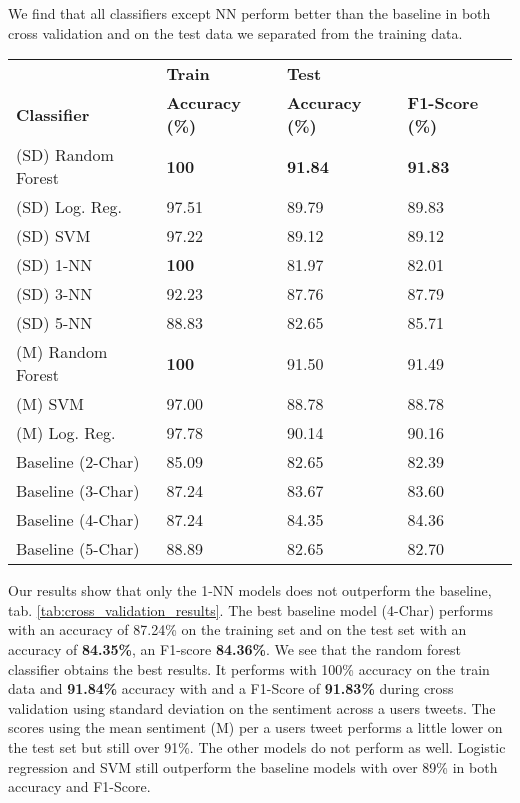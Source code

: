 We find that all classifiers except NN perform better than the baseline in both cross validation and on the test data we separated from the training data. \par

\begin{table*}[!h]
    \centering
    \begin{tabular}{ll|ll}
    \toprule
      & \textbf{Train} & \textbf{Test} &  \\
      \textbf{Classifier} & \textbf{Accuracy (\%)} & \textbf{Accuracy (\%)}  & \textbf{F1-Score (\%)}  \\
    \midrule
    (SD) Random Forest & \textbf{100} & \textbf{91.84} & \textbf{91.83} \\
    (SD) Log. Reg. & 97.51 & 89.79 & 89.83 \\
    (SD) SVM & 97.22 & 89.12 & 89.12 \\
    (SD) 1-NN & \textbf{100} & 81.97 & 82.01 \\
    (SD) 3-NN & 92.23 & 87.76 & 87.79\\
    (SD) 5-NN & 88.83 & 82.65 & 85.71\\
    (M) Random Forest & \textbf{100} & 91.50 & 91.49 \\
    (M) SVM & 97.00 & 88.78 & 88.78 \\
    (M) Log. Reg. & 97.78 & 90.14 & 90.16 \\
    
    \hline
    Baseline (2-Char) & 85.09 & 82.65 & 82.39 \\
    Baseline (3-Char) & 87.24 & 83.67 & 83.60 \\
    Baseline (4-Char) & 87.24 & 84.35 & 84.36 \\
    Baseline (5-Char) & 88.89 & 82.65 & 82.70 \\
    \bottomrule
    \end{tabular}
   \caption{Cross-Validation on 70\% of the train data, n splits = 7. In bold, the best performing metrics. (M) denotes that the mean sentiment was used to combine the Tweet Sentiment, while (SD) denotes standard deviation was used.}
    \label{tab:cross_validation_results}
\end{table*}


Our results show that only the 1-NN models does not outperform the baseline, tab. \ref{tab:cross_validation_results}. The best baseline model (4-Char) performs with an accuracy of 87.24\% on the training set and on the test set with an accuracy of \textbf{84.35\%}, an F1-score \textbf{84.36\%}. We see that the random forest classifier obtains the best results. It performs with 100\% accuracy on the train data and \textbf{91.84\%} accuracy with and a F1-Score of \textbf{91.83\%} during cross validation using standard deviation on the sentiment across a users tweets. The scores using the mean sentiment (M) per a users tweet performs a little lower on the test set but still over 91\%. The other models do not perform as well. Logistic regression and SVM still outperform the baseline models with over 89\% in both accuracy and F1-Score.

